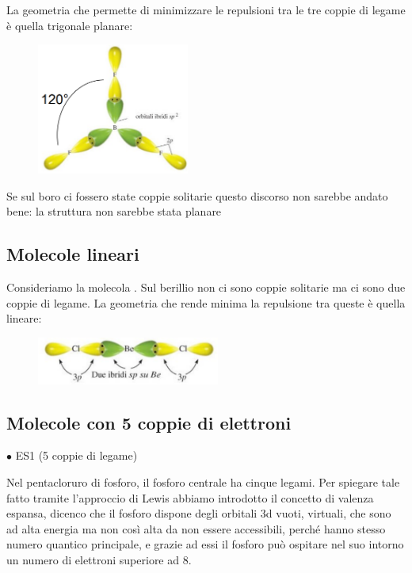 La geometria che permette di minimizzare le repulsioni tra le tre coppie di legame è quella trigonale planare:
\begin{figure}[htp]
    \centering
    \includegraphics[width=5cm]{immagini/BF_3.png}
\end{figure}
Se sul boro ci fossero state coppie solitarie questo discorso non sarebbe andato bene: la struttura non sarebbe stata planare
\subsection{Molecole lineari}
Consideriamo la molecola . Sul berillio non ci sono coppie solitarie ma ci sono due coppie di legame. La geometria che rende minima la repulsione tra queste è quella lineare:
\begin{figure}[htp]
    \centering
    \includegraphics[width=6cm]{immagini/BeCl_2.png}
\end{figure}
\subsection{Molecole con 5 coppie di elettroni}
$\bullet$ ES1  (5 coppie di legame)

Nel pentacloruro di fosforo, il fosforo centrale ha cinque legami. Per spiegare tale fatto tramite l'approccio di Lewis abbiamo introdotto il concetto di valenza espansa, dicenco che il fosforo dispone degli orbitali 3d vuoti, virtuali, che sono ad alta energia ma non così alta da non essere accessibili, perché hanno stesso numero quantico principale, e grazie ad essi il fosforo può ospitare nel suo intorno un numero di elettroni superiore ad 8.

